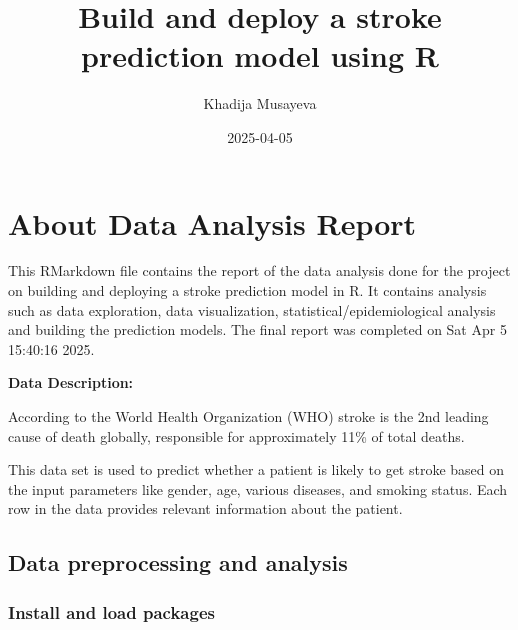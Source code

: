 \documentclass[
]{article}
\title{Build and deploy a stroke prediction model using R}
\author{Khadija Musayeva}
\date{2025-04-05}
\begin{document}
\maketitle

\section{About Data Analysis Report}\label{about-data-analysis-report}

This RMarkdown file contains the report of the data analysis done for
the project on building and deploying a stroke prediction model in R. It
contains analysis such as data exploration, data visualization,
statistical/epidemiological analysis and building the prediction models.
The final report was completed on Sat Apr 5 15:40:16 2025.

\textbf{Data Description:}

According to the World Health Organization (WHO) stroke is the 2nd
leading cause of death globally, responsible for approximately 11\% of
total deaths.

This data set is used to predict whether a patient is likely to get
stroke based on the input parameters like gender, age, various diseases,
and smoking status. Each row in the data provides relevant information
about the patient.

\subsection{Data preprocessing and
analysis}\label{data-preprocessing-and-analysis}

\subsubsection{Install and load
packages}\label{install-and-load-packages}
\end{document}
